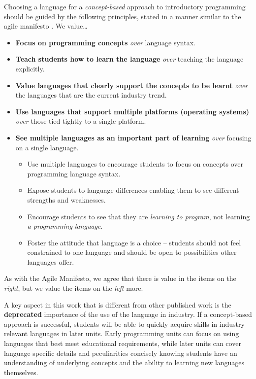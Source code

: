 Choosing a language for a \emph{concept-based} approach to introductory programming should be guided by the following principles, stated in a manner similar to the agile manifesto \cite{Beck:2001}. We value\ldots
\begin{itemize}[nolistsep,noitemsep]
	\item \textbf{Focus on programming concepts} \emph{over} language syntax.
	\item \textbf{Teach students how to learn the language} \emph{over} teaching the language explicitly.
	\item \textbf{Value languages that clearly support the concepts to be learnt} \emph{over} the languages that are the current industry trend.
	\item \textbf{Use languages that support multiple platforms (operating systems)} \emph{over} those tied tightly to a single platform. 
	\item \textbf{See multiple languages as an important part of learning} \emph{over} focusing on a single language.
	\begin{itemize}
		\item Use multiple languages to encourage students to focus on concepts over programming language syntax.
		\item Expose students to language differences enabling them to see different strengths and weaknesses. 
		\item Encourage students to see that they are \emph{learning to program}, not learning \emph{a programming language}.
		\item Foster the attitude that language is a choice -- students should not feel constrained to one language and should be open to possibilities other languages offer.
	\end{itemize}
\end{itemize}

As with the Agile Manifesto, we agree that there is value in the items on the \emph{right}, but we value the items on the \emph{left} more.

A key aspect in this work that is different from other published work is the \textbf{deprecated} importance of the use of the language in industry. If a concept-based approach is successful, students will be able to quickly acquire skills in industry relevant languages in later units. Early programming units can focus on using languages that best meet educational requirements, while later units can cover language specific details and peculiarities concisely knowing students have an understanding of underlying concepts and the ability to learning new languages themselves. 

